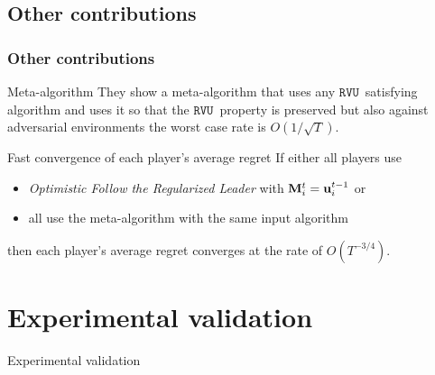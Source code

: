 \documentclass{beamer}
\renewcommand{\vec}[1]{\ensuremath{{\bf #1}}}
\newcommand{\myprop}{\ensuremath{\texttt{RVU}}}
\begin{document}
\subsection{Other contributions} %
\begin{frame}
 	\frametitle{Other contributions}
 	
 	
 	\begin{block}{Meta-algorithm}
 		They show a meta-algorithm that uses any \myprop~satisfying algorithm and uses it so that
 		the \myprop~property is preserved but also against adversarial environments the worst case rate is $O(1/\sqrt{T})$.
 	\end{block}
 	\pause
 	
 	\begin{block}{Fast convergence of each player's average regret}
 		If either all players use \\
 		\begin{itemize}
  		\item \textit{Optimistic Follow the Regularized Leader} with $\vec{M}_i^t = \vec{u}_i^{t-1}$ or
 			\item all use the meta-algorithm with the same input algorithm
 		\end{itemize}
 		then each player's average regret converges at the rate of $ O(T^{-3/4})$.
 	\end{block}
 	
\end{frame}









\section{Experimental validation}
\begin{frame}[c]
	\begin{center}
		\Huge Experimental validation
	\end{center}
\end{frame}
\end{document}
